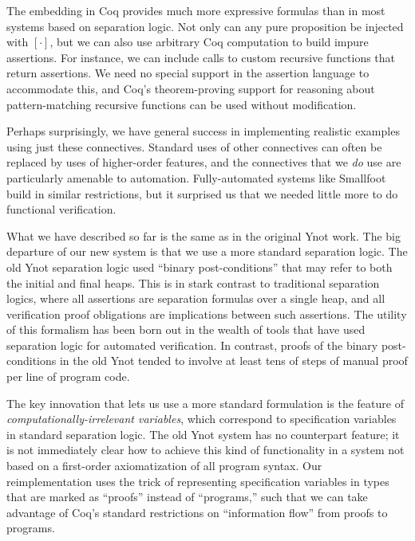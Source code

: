 \documentclass[preprint,nocopyrightspace]{sigplanconf}
\begin{document}
The embedding in Coq provides much more expressive formulas than in most systems based on separation logic.  Not only can any pure proposition be injected with $[\cdot]$, but we can also use arbitrary Coq computation to build impure assertions.  For instance, we can include calls to custom recursive functions that return assertions.  We need no special support in the assertion language to accommodate this, and Coq's theorem-proving support for reasoning about pattern-matching recursive functions can be used without modification.

Perhaps surprisingly, we have general success in implementing realistic examples using just these connectives.  Standard uses of other connectives can often be replaced by uses of higher-order features, and the connectives that we \emph{do} use are particularly amenable to automation.  Fully-automated systems like Smallfoot build in similar restrictions, but it surprised us that we needed little more to do functional verification.

\medskip

What we have described so far is the same as in the original Ynot
work.  The big departure of our new system is that we use a more
standard separation logic.  The old Ynot separation logic used
``binary post-conditions'' that may refer to both the initial and final
heaps.  This is in stark contrast to traditional separation logics,
where all assertions are separation formulas over a single heap, and
all verification proof obligations are implications between such
assertions.  The utility of this formalism has been born out in the
wealth of tools that have used separation logic for automated
verification.  In contrast, proofs of the binary post-conditions in the
old Ynot tended to involve at least tens of steps of manual proof per
line of program code.

The key innovation that lets us use a more standard formulation is the feature of \emph{computationally-irrelevant variables}, which correspond to specification variables in standard separation logic.  The old Ynot system has no counterpart feature; it is not immediately clear how to achieve this kind of functionality in a system not based on a first-order axiomatization of all program syntax.  Our reimplementation uses the trick of representing specification variables in types that are marked as ``proofs'' instead of ``programs,'' such that we can take advantage of Coq's standard restrictions on ``information flow'' from proofs to programs.
\end{document}
